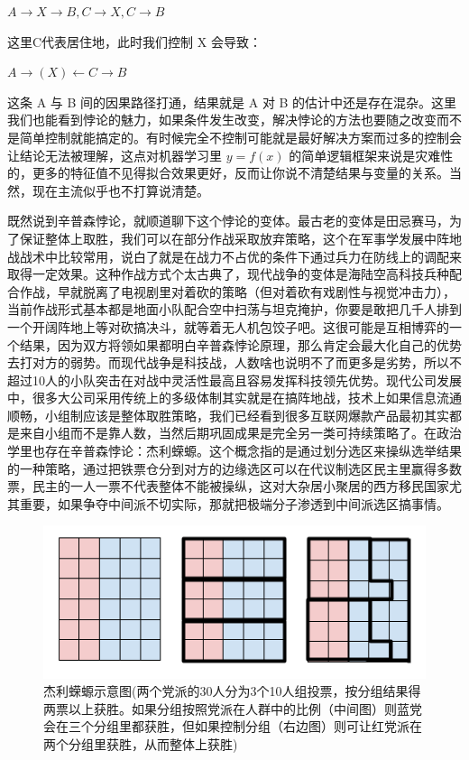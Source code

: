 \documentclass[]{tufte-book}
\begin{document}
\(A \rightarrow X\rightarrow B, C \rightarrow X, C \rightarrow B\)

这里C代表居住地，此时我们控制 X 会导致：

\(A \rightarrow (X) \leftarrow C \rightarrow B\)

这条 A 与 B 间的因果路径打通，结果就是 A 对 B 的估计中还是存在混杂。这里我们也能看到悖论的魅力，如果条件发生改变，解决悖论的方法也要随之改变而不是简单控制就能搞定的。有时候完全不控制可能就是最好解决方案而过多的控制会让结论无法被理解，这点对机器学习里 \(y = f(x)\) 的简单逻辑框架来说是灾难性的，更多的特征值不见得拟合效果更好，反而让你说不清楚结果与变量的关系。当然，现在主流似乎也不打算说清楚。

既然说到辛普森悖论，就顺道聊下这个悖论的变体。最古老的变体是田忌赛马，为了保证整体上取胜，我们可以在部分作战采取放弃策略，这个在军事学发展中阵地战战术中比较常用，说白了就是在战力不占优的条件下通过兵力在防线上的调配来取得一定效果。这种作战方式个太古典了，现代战争的变体是海陆空高科技兵种配合作战，早就脱离了电视剧里对着砍的策略（但对着砍有戏剧性与视觉冲击力），当前作战形式基本都是地面小队配合空中扫荡与坦克掩护，你要是敢把几千人排到一个开阔阵地上等对砍搞决斗，就等着无人机包饺子吧。这很可能是互相博弈的一个结果，因为双方将领如果都明白辛普森悖论原理，那么肯定会最大化自己的优势去打对方的弱势。而现代战争是科技战，人数啥也说明不了而更多是劣势，所以不超过10人的小队突击在对战中灵活性最高且容易发挥科技领先优势。现代公司发展中，很多大公司采用传统上的多级体制其实就是在搞阵地战，技术上如果信息流通顺畅，小组制应该是整体取胜策略，我们已经看到很多互联网爆款产品最初其实都是来自小组而不是靠人数，当然后期巩固成果是完全另一类可持续策略了。在政治学里也存在辛普森悖论：杰利蝾螈。这个概念指的是通过划分选区来操纵选举结果的一种策略，通过把铁票仓分到对方的边缘选区可以在代议制选区民主里赢得多数票，民主的一人一票不代表整体不能被操纵，这对大杂居小聚居的西方移民国家尤其重要，如果争夺中间派不切实际，那就把极端分子渗透到中间派选区搞事情。

\begin{figure}
\includegraphics{data/gerrymandering} \caption[杰利蝾螈示意图(两个党派的30人分为3个10人组投票，按分组结果得两票以上获胜。如果分组按照党派在人群中的比例（中间图）则蓝党会在三个分组里都获胜，但如果控制分组（右边图）则可让红党派在两个分组里获胜，从而整体上获胜)]{杰利蝾螈示意图(两个党派的30人分为3个10人组投票，按分组结果得两票以上获胜。如果分组按照党派在人群中的比例（中间图）则蓝党会在三个分组里都获胜，但如果控制分组（右边图）则可让红党派在两个分组里获胜，从而整体上获胜)}\label{fig:unnamed-chunk-16}
\end{figure}
\end{document}
